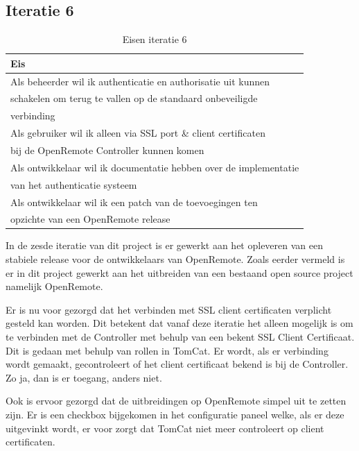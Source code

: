 \documentclass[]{article}
\begin{document}
\subsection{Iteratie 6}
\begin{table}[htpb]
  \caption{Eisen iteratie 6}
  \begin{center}
    \begin{tabular}{|| l ||}\hline
        Eis                                                              \\\hline\hline
        Als beheerder wil ik authenticatie en authorisatie uit kunnen    \\
        schakelen om terug te vallen op de standaard onbeveiligde        \\ 
        verbinding                                                       \\\hline
        Als gebruiker wil ik alleen via SSL port \& client certificaten  \\ 
        bij de OpenRemote Controller kunnen komen                        \\\hline
        Als ontwikkelaar wil ik documentatie hebben over de implementatie\\ 
        van het authenticatie systeem                                    \\\hline
        Als ontwikkelaar wil ik een patch van de toevoegingen ten        \\
        opzichte van een OpenRemote release                              \\\hline
    \end{tabular}
  \end{center}
\end{table}

In de zesde iteratie van dit project is er gewerkt aan het opleveren van een
stabiele release voor de ontwikkelaars van OpenRemote. Zoals eerder vermeld is
er in dit project gewerkt aan het uitbreiden van een bestaand open source
project namelijk OpenRemote. 

Er is nu voor gezorgd dat het verbinden met SSL client certificaten verplicht
gesteld kan worden. Dit betekent dat vanaf deze iteratie het alleen mogelijk is
om te verbinden met de Controller met behulp van een bekent SSL Client
Certificaat. Dit is gedaan met behulp van rollen in TomCat. Er wordt,
als er verbinding wordt gemaakt, gecontroleert of het client certificaat bekend
is bij de Controller. Zo ja, dan is er toegang, anders niet.

Ook is ervoor gezorgd dat de uitbreidingen op OpenRemote simpel uit te zetten
zijn. Er is een checkbox bijgekomen in het configuratie paneel welke, als er
deze uitgevinkt wordt, er voor zorgt dat TomCat niet meer controleert op client
certificaten. 
\end{document}
